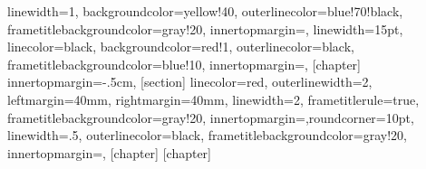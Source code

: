 \newenvironment{colbox}[1]
{
	\def\FrameCommand{\colorbox{colboxcolor}}%
	\MakeFramed{\advance\hsize-\width \FrameRestore\cornersize{0.9}}
	\begin{scriptsize}
	\section{#1}
}
{
    \end{scriptsize}
	\endMakeFramed
}
\newenvironment{colbox2}[1]
{
	\def\FrameCommand{\colorbox{legendcol}}%
	\MakeFramed{\advance\hsize-\width \FrameRestore}
	\begin{footnotesize}
}
{
\end{footnotesize}
	\endMakeFramed
}
\newenvironment{abstract}%
{
    \cleardoublepage\thispagestyle{empty}\null\vfill\begin{center}%
    \bfseries\abstractname\end{center}
}
{
	\vfill\null
}
 {linewidth=1,
 backgroundcolor=yellow!40,
 outerlinecolor=blue!70!black,
 frametitlebackgroundcolor=gray!20,
 innertopmargin=\topskip,}
 {linewidth=15pt,
 linecolor=black,
 backgroundcolor=red!1,
 outerlinecolor=black,
 frametitlebackgroundcolor=blue!10,
 innertopmargin=\topskip,}
 [chapter]
 {%
 innertopmargin=-.5cm,}
 [section]
 {linecolor=red,
 outerlinewidth=2,
 leftmargin=40mm,
 rightmargin=40mm,
 linewidth=2,
 frametitlerule=true,
 frametitlebackgroundcolor=gray!20,
 innertopmargin=\topskip,roundcorner=10pt,}
 {linewidth=.5,
 outerlinecolor=black,
 frametitlebackgroundcolor=gray!20,
 innertopmargin=\topskip,}
 [chapter]
 [chapter]
